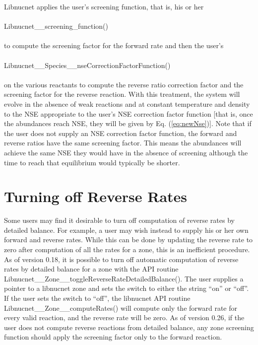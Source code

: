 \documentclass{article}    %
\begin{document}
Libnucnet applies the user's screening function, that is, his or her\\
\\
Libnucnet\_\_screening\_function()\\
\\
to compute the screening
factor for the forward rate and then the user's\\
\\
Libnucnet\_\_Species\_\_nseCorrectionFactorFunction()\\
\\
on the various reactants to compute the reverse ratio correction factor
and the screening factor for the
reverse reaction.  With this treatment, the system will evolve in the
absence of weak reactions and at constant temperature and
density to the NSE appropriate
to the user's NSE correction factor function [that is, once the abundances
reach NSE, they will be given by Eq. (\ref{eq:newNse})].  Note that if the
user does not supply an NSE correction factor function, the forward and
reverse ratios have the same screening factor.
This means the abundances will achieve the same NSE they would have in the
absence of screening although the time to reach that equilibrium would
typically be shorter.

\section{Turning off Reverse Rates}

Some users may find it desirable to turn off computation of reverse rates
by detailed balance.  For example, a user may wish instead to supply his or
her own forward and reverse rates.  While this can be done by updating the
reverse rate to zero after computation of all the rates for a zone, this
is an inefficient procedure.  As of version 0.18, it is possible to turn
off automatic computation of reverse rates by detailed balance for a zone
with the API routine Libnucnet\_\_Zone\_\_toggleReverseRateDetailedBalance().
The user supplies a pointer to a libnucnet zone and sets the switch to
either the string ``on'' or ``off''.  If the user sets the switch to ``off'',
the libnucnet API routine Libnucnet\_\_Zone\_\_computeRates()
will compute only the forward rate for every valid reaction, and
the reverse rate will be zero.  As of version 0.26, if the user
does not compute reverse reactions from detailed balance, any zone
screening function should apply the screening factor only to the forward
reaction.
\end{document}
